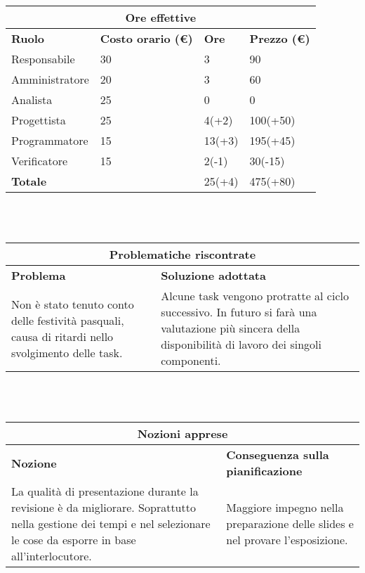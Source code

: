 \documentclass[a4paper, 12pt]{article}
\begin{document}
\begin{center}
    \begin{tabularx}{\textwidth}{|X|X|X|X|}
        \hline
        \multicolumn{4}{|c|}{\textbf{Ore effettive}}\\
        \hline
        \hline
        \textbf{Ruolo} & \textbf{Costo orario (\euro)} & \textbf{Ore} & \textbf{Prezzo (\euro)}\\
        \hline
        Responsabile    & 30 & 3  & 90\\
        \hline
        Amministratore  & 20 & 3  & 60\\
        \hline
        Analista        & 25 & 0  & 0\\
        \hline
        Progettista     & 25 & 4(+2) & 100(+50)\\
        \hline
        Programmatore   & 15 & 13(+3)  & 195(+45)\\
        \hline
        Verificatore    & 15 & 2(-1)  & 30(-15)\\
        \hline
        \hline
        \textbf{Totale} &    & 25(+4) & 475(+80)\\
        \hline
    \end{tabularx}\\[8pt]
    \mbox{}\\
\end{center}

\begin{center}
    \begin{tabularx}{\textwidth}{|X|X|}
        \hline
        \multicolumn{2}{|c|}{\textbf{Problematiche riscontrate}}\\
        \hline
        \hline
        \textbf{Problema} & \textbf{Soluzione adottata}\\
        \hline
        Non è stato tenuto conto delle festività pasquali, causa di ritardi nello svolgimento delle task. & Alcune task vengono protratte al ciclo successivo. In futuro si farà una valutazione più sincera della disponibilità di lavoro dei singoli componenti. \\
        \hline
    \end{tabularx}\\[8pt]
    \mbox{}\\
\end{center}

\begin{center}
    \begin{tabularx}{\textwidth}{|X|X|}
        \hline
        \multicolumn{2}{|c|}{\textbf{Nozioni apprese}}\\
        \hline
        \hline
        \textbf{Nozione} & \textbf{Conseguenza sulla pianificazione}\\
        \hline
        La qualità di presentazione durante la revisione è da migliorare. Soprattutto nella gestione dei tempi e nel selezionare le cose da esporre in base all'interlocutore.  & Maggiore impegno nella preparazione delle slides e nel provare l'esposizione. \\
        \hline
    \end{tabularx}\\[8pt]
    \mbox{}\\
\end{center}
\end{document}
